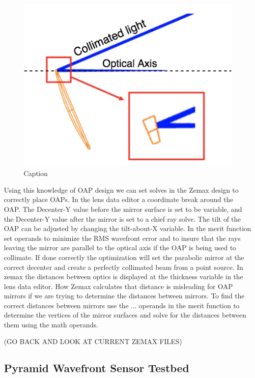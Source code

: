 \begin{figure}
    \centering
    \includegraphics{Chapter Materials/Chapter Five Materials/OAPexample.png}
    \caption{Caption}
    \label{fig:OAPex}
\end{figure}

Using this knowledge of OAP design we can set solves in the Zemax design to correctly place OAPs. In the lens data editor a coordinate break around the OAP. The Decenter-Y value before the mirror surface is set to be variable, and the Decenter-Y value after the mirror is set to a chief ray solve. The tilt of the OAP can be adjusted by changing the tilt-about-X variable.  In the merit function set operands to minimize the RMS wavefront error and to insure that the rays leaving the mirror are parallel to the optical axis if the OAP is being used to collimate. If done correctly the optimization will set the parabolic mirror at the correct decenter and create a perfectly collimated beam from a point source. In zemax the distances between optics is displayed at the thickness variable in the lens data editor. How Zemax calculates that distance is misleading for OAP mirrors if we are trying to determine the distances between mirrors. To find the correct distances between mirrors use the ... operands in the merit function to determine the vertices of the mirror surfaces and solve for the distances between them using the math operands. 

(GO BACK AND LOOK AT CURRENT ZEMAX FILES)




\subsection{Pyramid Wavefront Sensor Testbed}

